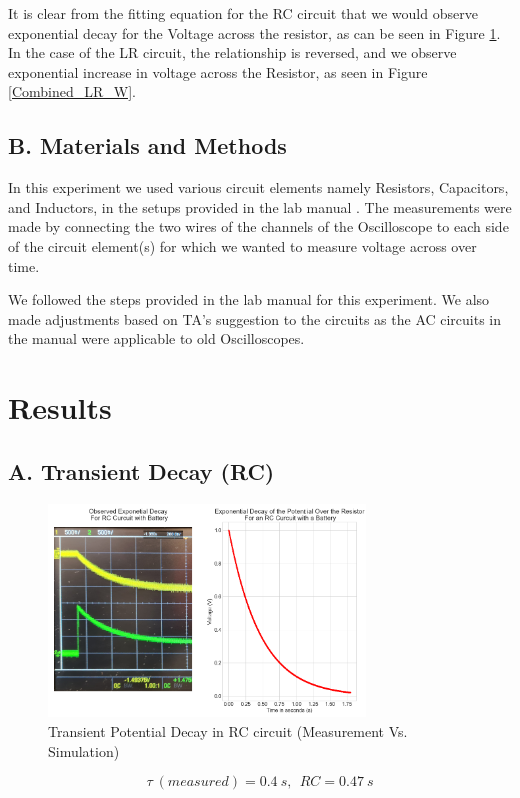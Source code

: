 \documentclass[a4paper,12pt]{article}
\begin{document}
It is clear from the fitting equation for the RC circuit that we would observe exponential decay for the Voltage across the resistor, as can be seen in Figure \ref{Combined_RC_B}. In the case of the LR circuit, the relationship is reversed, and we observe exponential increase 
in voltage across the Resistor, as seen in Figure \ref{Combined_LR_W}.

\subsection*{B. Materials and Methods}

In this experiment we used various circuit elements namely Resistors, Capacitors, and Inductors, in the setups provided
in the lab manual \cite{lab-manual-ex7}. The measurements were made by connecting the two wires of the channels of the Oscilloscope to each side of the circuit element(s) for which we wanted to measure voltage across over time.

We followed the steps provided in the lab manual \cite{lab-manual-ex7} for this 
experiment. We also made adjustments based on TA's suggestion to the circuits as the 
AC circuits in the manual were applicable to old Oscilloscopes.

\section{Results}
\subsection*{A. Transient Decay (RC)}

\begin{figure}[H]
  \centerline{\includegraphics[width=0.75\textwidth]{../Simulated Curves/RC_B-mod.png}}
  \caption{Transient Potential Decay in RC circuit (Measurement Vs. Simulation)}
  \label{Combined_RC_B}
\end{figure}
$$\tau\ (measured) = 0.4\ s, \ \ RC = 0.47\ s$$
\end{document}
